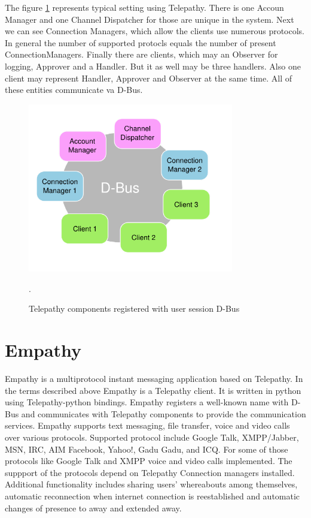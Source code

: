 The figure \ref{fig:telepathyComponentsDbus} represents typical setting using Telepathy. There is one Accoun Manager and one Channel Dispatcher for those are unique in the system. Next we can see Connection Managers, which allow the clients use numerous protocols. In general the number of supported protocls equals the number of present ConnectionManagers. Finally there are clients, which may an Observer for logging, Approver and a Handler. But it as well may be three handlers. Also one client may represent Handler, Approver and Observer at the same time. All of these entities communicate va D-Bus.  

\begin{figure}[ht]
	\begin{center}
	\includegraphics[width=9cm]{fig/telepathy-components-dbus.png}
	\caption{Telepathy components registered with user session D-Bus \cite{TPWiki}}.
	\label{fig:telepathyComponentsDbus}
\end{center}
\end{figure}



\section{Empathy}
Empathy is a multiprotocol instant messaging application based on Telepathy. In the terms described above Empathy is a Telepathy client. It is written in python using Telepathy-python bindings. Empathy registers a well-known name with D-Bus and communicates with Telepathy components to provide the communication services. Empathy supports text messaging, file transfer, voice and video calls over various protocols. Supported protocol include Google Talk, XMPP/Jabber, MSN, IRC, AIM Facebook, Yahoo!, Gadu Gadu, and ICQ. For some of those protocols like Google Talk and XMPP voice and video calls implemented. The suppport of the protocols depend on Telepathy Connection managers installed. Additional functionality includes sharing users' whereabouts among themselves, automatic reconnection when internet connection is reestablished and automatic changes of presence to away and extended away.\cite{empathyGnome}

